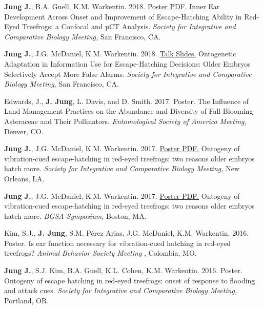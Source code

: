 \documentclass[margin,line]{res}
\begin{document}
\begin{resume}
{\bf Jung J.}, B.A. Guell, K.M. Warkentin. {2018.} \href{https://drive.google.com/file/d/1jQvmK-PIwGql03SKWepPZrhPUJudxjBC/view?usp=sharing}{\ttfamily Poster PDF.} {Inner Ear Development Across Onset and Improvement of Escape-Hatching Ability in Red-Eyed Treefrogs: a Confocal and µCT Analysis.} {\it Society for Integrative and Comparative Biology Meeting,} {San Francisco, CA.}

\vspace{-.25cm}
{\bf Jung J.}, J.G. McDaniel, K.M. Warkentin. {2018.} \href{https://drive.google.com/file/d/1DSi8cEAavbRRRWhluw7jAS0xqfiiMM3Y/view?usp=sharing}{\ttfamily Talk Slides.} {Ontogenetic Adaptation in Information Use for Escape-Hatching Decisions: Older Embryos Selectively Accept More False Alarms.} {\it Society for Integrative and Comparative Biology Meeting,} {San Francisco, CA.}

\vspace{-.25cm}
Edwards, J., {\bf J. Jung}, L. Davis, and D. Smith. {2017.} {Poster.} {The Influence of Land Management Practices on the Abundance and Diversity of Fall-Blooming Asteraceae and Their Pollinators.} {\it Entomological Society of America Meeting,} {Denver, CO.}

\vspace{-.25cm}
{\bf Jung J.}, J.G. McDaniel, K.M. Warkentin. {2017.} \href{https://drive.google.com/file/d/1_J0DkTA0vPvlbDVP5203JhYh7vmW2zv2/view?usp=sharing}{\ttfamily Poster PDF.} {Ontogeny of vibration-cued escape-hatching in red-eyed treefrogs: two reasons older embryos hatch more.} {\it Society for Integrative and Comparative Biology Meeting,} {New Orleans, LA.}

\vspace{-.25cm}
{\bf Jung J.}, J.G. McDaniel, K.M. Warkentin. {2017.} \href{https://drive.google.com/file/d/1_J0DkTA0vPvlbDVP5203JhYh7vmW2zv2/view?usp=sharing}{\ttfamily Poster PDF.} {Ontogeny of vibration-cued escape-hatching in red-eyed treefrogs: two reasons older embryos hatch more.} {\it BGSA Symposium,} {Boston, MA.}

\vspace{-.25cm}
Kim, S.J., {\bf J. Jung}, S.M. Pérez Arias, J.G. McDaniel, K.M. Warkentin. {2016.} {Poster.} {Is ear function necessary for vibration-cued hatching in red-eyed treefrogs?} {\it Animal Behavior Society Meeting} {, Colombia, MO.}

\vspace{-.25cm}
{\bf Jung J.}, S.J. Kim, B.A. Guell, K.L. Cohen, K.M. Warkentin. {2016.} {Poster.} {Ontogeny of escape hatching in red-eyed treefrogs: onset of response to flooding and attack cues.} {\it Society for Integrative and Comparative Biology Meeting,} {Portland, OR.}


\end{resume}
\end{document}
